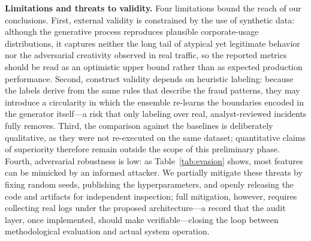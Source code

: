 \documentclass[conference]{IEEEtran}
\begin{document}
\textbf{Limitations and threats to validity.} Four limitations bound
the reach of our conclusions. First, external validity is constrained by
the use of synthetic data: although the generative process reproduces
plausible corporate-usage distributions, it captures neither the long
tail of atypical yet legitimate behavior nor the adversarial creativity
observed in real traffic, so the reported metrics should be read as an
optimistic upper bound rather than as expected production performance.
Second, construct validity depends on heuristic labeling: because the
labels derive from the same rules that describe the fraud patterns, they
may introduce a circularity in which the ensemble re-learns the
boundaries encoded in the generator itself---a risk that only labeling
over real, analyst-reviewed incidents fully removes. Third, the
comparison against the baselines is deliberately qualitative, as they
were not re-executed on the same dataset; quantitative claims of
superiority therefore remain outside the scope of this preliminary
phase. Fourth, adversarial robustness is low: as
Table~\ref{tab:evasion} shows, most features can be mimicked by an
informed attacker. We partially mitigate these threats by fixing random
seeds, publishing the hyperparameters, and openly releasing the code and
artifacts for independent inspection; full mitigation, however, requires
collecting real logs under the proposed architecture---a record that
the audit layer, once implemented, should make verifiable---closing the
loop between methodological evaluation and actual
system operation.
\end{document}
